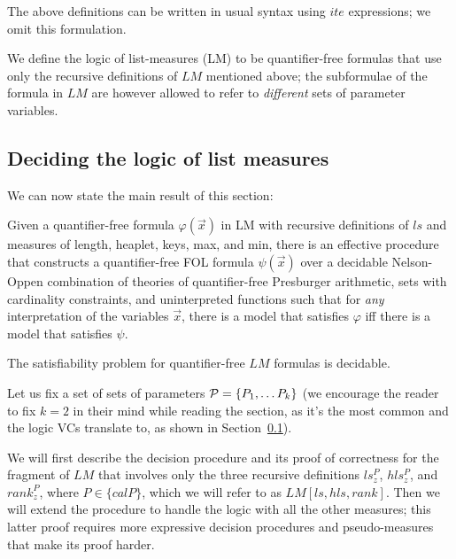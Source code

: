\begin{definition}
\begin{itemize}
\end{itemize}
\end{definition}

The above definitions can be written in usual syntax using $\textit{ite}$ expressions; we omit this 
formulation.

We define the logic of list-measures (LM) to be quantifier-free formulas that use only the recursive 
definitions of $LM$ mentioned above; the subformulae of the formula in $LM$ are however allowed
to refer to \emph{different} sets of parameter variables.



\subsection{Deciding the logic of list measures}
We can now state the main result of this section:

\begin{theorem}
	Given a quantifier-free formula $\varphi(\vec{x})$ in LM with recursive definitions
	of $ls$ and measures of length, heaplet, keys, max, and min, there is
	an effective procedure that constructs a quantifier-free FOL formula $\psi(\vec{x})$ over 
	a decidable Nelson-Oppen combination of theories of quantifier-free Presburger arithmetic, 
	sets with cardinality constraints, and uninterpreted functions such that for \emph{any}
	interpretation of the variables $\vec{x}$, there is a model that satisfies $\varphi$ iff there
	is a model that satisfies $\psi$.
\end{theorem}


\begin{corollary}
	 The satisfiability problem for quantifier-free $LM$ formulas is decidable.
\end{corollary}

Let us fix a set of sets of parameters ${\cal P} = \{P_1, \ldots P_k\}$
(we encourage the reader to fix $k=2$ in their mind while reading the section, as it's the
most common and the logic VCs translate to, as shown in Section~\ref{}).

We will first describe the decision procedure and its proof of correctness for the fragment
of $LM$ that involves only the three recursive definitions $ls_z^P$, $hls_z^P$, and $rank_z^P$,
where $P \in \{cal P\}$, which we will refer to as $LM[ls,hls,rank]$. 
Then we will extend the procedure to handle the logic with all the other measures; this latter
proof requires more expressive decision procedures and pseudo-measures that make its proof harder.

